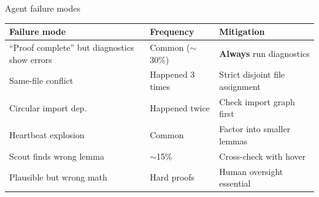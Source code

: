 \documentclass[aspectratio=169,10pt]{beamer}
\begin{document}
\begin{frame}{Agent failure modes}
    \vspace{-0.4em}
    \begin{center}
    \renewcommand{\arraystretch}{1.15}
    {\footnotesize
    \begin{tabular}{@{}p{3.8cm} p{3.5cm} p{4.5cm}@{}}
        \toprule
        \textbf{Failure mode} & \textbf{Frequency} & \textbf{Mitigation} \\
        \midrule
        \textcolor{softred}{``Proof complete'' but diagnostics show errors} & Common ($\sim$30\%) & \textbf{Always} run diagnostics \\
        \textcolor{softred}{Same-file conflict} & Happened 3 times & Strict disjoint file assignment \\
        \textcolor{softred}{Circular import dep.} & Happened twice & Check import graph first \\
        \textcolor{softred}{Heartbeat explosion} & Common & Factor into smaller lemmas \\
        \textcolor{amber}{Scout finds wrong lemma} & $\sim$15\% & Cross-check with hover \\
        \textcolor{amber}{Plausible but wrong math} & Hard proofs & Human oversight essential \\
        \bottomrule
    \end{tabular}
    }
    \end{center}
\end{frame}
\end{document}

